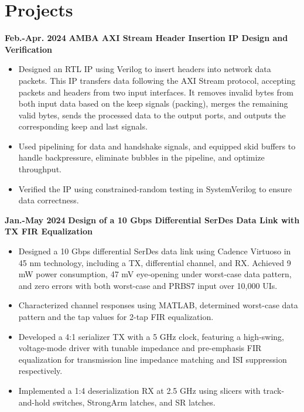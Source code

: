 \documentclass[11pt,a4paper,sans]{moderncv}
\begin{document}
\vspace{-0.3cm} 

\section{Projects}

\cventry
{\textnormal{\textbf{Feb.-Apr. 2024}}}
{\textnormal{\textbf{AMBA AXI Stream Header Insertion IP Design and Verification}}}
{}{}{}
{
    \begin{itemize}
        \item Designed an RTL IP using Verilog to insert headers into network data packets. This IP transfers data following the AXI Stream protocol, accepting packets and headers from two input interfaces. It removes invalid bytes from both input data based on the keep signals (packing), merges the remaining valid bytes, sends the processed data to the output ports, and outputs the corresponding keep and last signals.
        \item Used pipelining for data and handshake signals, and equipped skid buffers to handle backpressure, eliminate bubbles in the pipeline, and optimize throughput.
        \item Verified the IP using constrained-random testing in SystemVerilog to ensure data correctness.
    \end{itemize}
}


\cventry
{\textnormal{\textbf{Jan.-May 2024}}}
{\textnormal{\textbf{Design of a 10 Gbps Differential SerDes Data Link with TX FIR Equalization}}}
{}{}{}
{
    \begin{itemize}
        \item Designed a 10 Gbps differential SerDes data link using Cadence Virtuoso in 45 nm technology, including a TX, differential channel, and RX. Achieved 9 mW power consumption, 47 mV eye-opening under worst-case data pattern, and zero errors with both worst-case and PRBS7 input over 10,000 UIs.
        \item Characterized channel responses using MATLAB, determined worst-case data pattern and the tap values for 2-tap FIR equalization.
        \item Developed a 4:1 serializer TX with a 5 GHz clock, featuring a high-swing, voltage-mode driver with tunable impedance and pre-emphasis FIR equalization for transmission line impedance matching and ISI suppression respectively.
        \item Implemented a 1:4 deserialization RX at 2.5 GHz using slicers with track-and-hold switches, StrongArm latches, and SR latches.
    \end{itemize}
}
\end{document}
